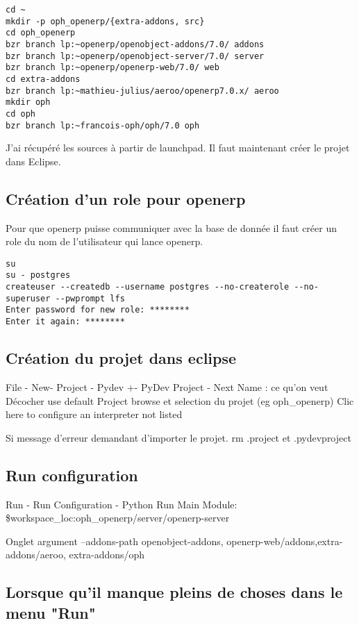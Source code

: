 \documentclass[12pt,a4paper]{article}
\begin{document}
\begin{verbatim}
cd ~
mkdir -p oph_openerp/{extra-addons, src}
cd oph_openerp
bzr branch lp:~openerp/openobject-addons/7.0/ addons
bzr branch lp:~openerp/openobject-server/7.0/ server
bzr branch lp:~openerp/openerp-web/7.0/ web
cd extra-addons
bzr branch lp:~mathieu-julius/aeroo/openerp7.0.x/ aeroo
mkdir oph
cd oph
bzr branch lp:~francois-oph/oph/7.0 oph

\end{verbatim}

J'ai récupéré les sources à partir de launchpad.
Il faut maintenant créer le projet dans Eclipse. 

\subsection{Création d'un role pour openerp}
\label{sec:role}

Pour que openerp puisse communiquer avec la base de donnée il faut créer un role du nom de l'utilisateur qui lance openerp.

\begin{verbatim}
su
su - postgres
createuser --createdb --username postgres --no-createrole --no-superuser --pwprompt lfs
Enter password for new role: ********
Enter it again: ********
\end{verbatim}

\subsection{Création du projet dans eclipse}
\label{sec:createproject}
File - New- Project - Pydev +- PyDev Project - Next
Name : ce qu'on veut
Décocher use default
Project browse et selection du projet (eg oph\_openerp)
Clic here to configure an interpreter not listed

Si message d'erreur demandant d'importer le projet. rm .project et .pydevproject
\subsection{Run configuration}
\label{sec:runconfig}
Run - Run Configuration - Python Run
Main Module: \${workspace\_loc:oph\_openerp/server/openerp-server}

Onglet argument
--addons-path openobject-addons, openerp-web/addons,extra-addons/aeroo, extra-addons/oph


\subsection{Lorsque qu'il manque pleins de choses dans le menu "Run"}
\label{sec:run_without}
\end{document}
